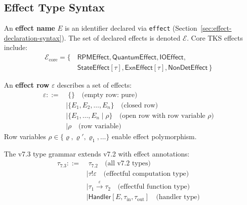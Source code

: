 \subsection{Effect Type Syntax}
\label{subsec:effect-type-syntax}

\begin{definition}
\label{def:effect-names}
An \textbf{effect name} $E$ is an identifier declared via \texttt{effect} (Section~\ref{sec:effect-declaration-syntax}). The set of declared effects is denoted $\mathcal{E}$. Core TKS effects include:
\begin{align}
\mathcal{E}_{\mathrm{core}} = \{&\, \mathsf{RPMEffect}, \mathsf{QuantumEffect}, \mathsf{IOEffect}, \\
    &\, \mathsf{StateEffect}[\tau], \mathsf{ExnEffect}[\tau], \mathsf{NonDetEffect} \,\}
\end{align}
\end{definition}

\begin{definition}
\label{def:effect-row-syntax}
An \textbf{effect row} $\varepsilon$ describes a set of effects:
\begin{align}
\varepsilon ::=&\; \{\} \quad \text{(empty row: pure)} \\
    &\mid \{E_1, E_2, \ldots, E_n\} \quad \text{(closed row)} \\
    &\mid \{E_1, \ldots, E_n \mid \rho\} \quad \text{(open row with row variable } \rho \text{)} \\
    &\mid \rho \quad \text{(row variable)}
\end{align}
Row variables $\rho \in \{\varrho, \varrho', \varrho_1, \ldots\}$ enable effect polymorphism.
\end{definition}

\begin{definition}
\label{def:effectful-type}
The v7.3 type grammar extends v7.2 with effect annotations:
\begin{align}
\tau_{7.3} ::=&\; \tau_{7.2} \quad \text{(all v7.2 types)} \\
    &\mid \tau \mathbin{!} \varepsilon \quad \text{(effectful computation type)} \\
    &\mid \tau_1 \xrightarrow{\varepsilon} \tau_2 \quad \text{(effectful function type)} \\
    &\mid \mathsf{Handler}[E, \tau_{\mathrm{in}}, \tau_{\mathrm{out}}] \quad \text{(handler type)}
\end{align}
\end{definition}

